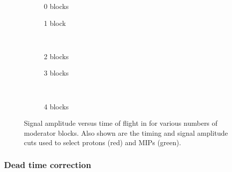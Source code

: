 \begin{figure}[t]
  \begin{subfigure}[t]{.5\textwidth}
    \begin{adjustbox}{max totalsize=\textwidth, center}
      
    \end{adjustbox}
    \caption{0 blocks}
  \end{subfigure}
  \hfill
  \begin{subfigure}[t]{.5\textwidth}
    \begin{adjustbox}{max totalsize=\textwidth, center}
            
    \end{adjustbox}
    \caption{1 block}
  \end{subfigure} \\
  \begin{subfigure}[t]{.5\textwidth}
    \begin{adjustbox}{max totalsize=\textwidth, center}
      
    \end{adjustbox}
    \caption{2 blocks}
  \end{subfigure}
  \hfill
  \begin{subfigure}[t]{.5\textwidth}
    \begin{adjustbox}{max totalsize=\textwidth, center}
      
    \end{adjustbox}
    \caption{3 blocks}
  \end{subfigure} \\

  \begin{subfigure}[t]{\textwidth}
    \begin{adjustbox}{max totalsize=.5\textwidth, center}
      
    \end{adjustbox}
    \caption{4 blocks}
  \end{subfigure}

  \caption[Signal amplitude versus time of flight in \SThree]{Signal amplitude versus time of flight in \SThree for various numbers of moderator blocks. Also shown are the timing and signal amplitude cuts used to select protons (red) and MIPs (green).}
  \label{fig:tvsa}
\end{figure}

\subsubsection{Dead time correction}
\label{sec:hptpc_beam_flux:methods:s3:deadtime}


